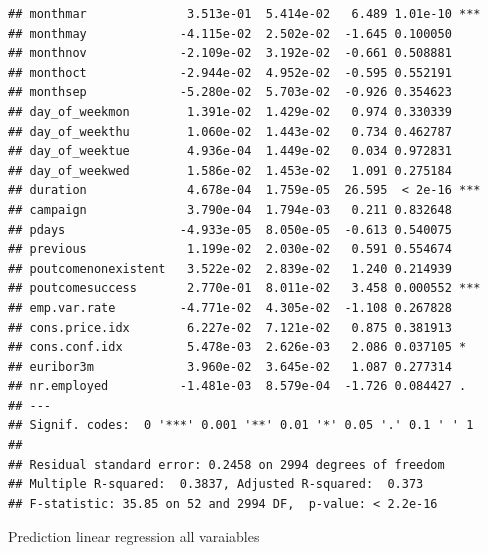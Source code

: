 \documentclass[
]{article}
\begin{document}
\begin{verbatim}
## monthmar              3.513e-01  5.414e-02   6.489 1.01e-10 ***
## monthmay             -4.115e-02  2.502e-02  -1.645 0.100050    
## monthnov             -2.109e-02  3.192e-02  -0.661 0.508881    
## monthoct             -2.944e-02  4.952e-02  -0.595 0.552191    
## monthsep             -5.280e-02  5.703e-02  -0.926 0.354623    
## day_of_weekmon        1.391e-02  1.429e-02   0.974 0.330339    
## day_of_weekthu        1.060e-02  1.443e-02   0.734 0.462787    
## day_of_weektue        4.936e-04  1.449e-02   0.034 0.972831    
## day_of_weekwed        1.586e-02  1.453e-02   1.091 0.275184    
## duration              4.678e-04  1.759e-05  26.595  < 2e-16 ***
## campaign              3.790e-04  1.794e-03   0.211 0.832648    
## pdays                -4.933e-05  8.050e-05  -0.613 0.540075    
## previous              1.199e-02  2.030e-02   0.591 0.554674    
## poutcomenonexistent   3.522e-02  2.839e-02   1.240 0.214939    
## poutcomesuccess       2.770e-01  8.011e-02   3.458 0.000552 ***
## emp.var.rate         -4.771e-02  4.305e-02  -1.108 0.267828    
## cons.price.idx        6.227e-02  7.121e-02   0.875 0.381913    
## cons.conf.idx         5.478e-03  2.626e-03   2.086 0.037105 *  
## euribor3m             3.960e-02  3.645e-02   1.087 0.277314    
## nr.employed          -1.481e-03  8.579e-04  -1.726 0.084427 .  
## ---
## Signif. codes:  0 '***' 0.001 '**' 0.01 '*' 0.05 '.' 0.1 ' ' 1
## 
## Residual standard error: 0.2458 on 2994 degrees of freedom
## Multiple R-squared:  0.3837, Adjusted R-squared:  0.373 
## F-statistic: 35.85 on 52 and 2994 DF,  p-value: < 2.2e-16
\end{verbatim}

Prediction linear regression all varaiables
\end{document}
